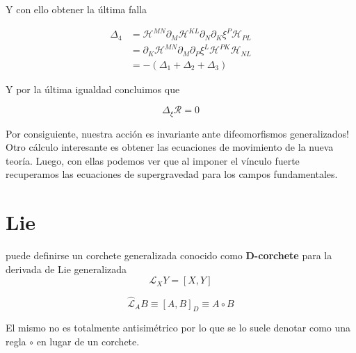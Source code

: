 \documentclass{article}
\numberwithin{equation}{section}
\begin{document}
Y con ello obtener la última falla

\begin{equation}\label{key}
\begin{aligned}
\Delta_4 &= \mathcal{H}^{MN}\partial_M \mathcal{H}^{KL}\partial_N\partial_K \xi^P\mathcal{H}_{PL}\\
&= \partial_K \mathcal{H}^{MN}\partial_M\partial_P \xi^L \mathcal{H}^{PK}\mathcal{H}_{NL}\\
&= - \left( \Delta_1 + \Delta_2 + \Delta_3\right)
\end{aligned}
\end{equation}

Y por la última igualdad concluimos que 

\begin{boxquation}
\begin{equation}\label{key}
\Delta_{\xi} \mathcal{R} = 0
\end{equation}
\end{boxquation}

Por consiguiente, nuestra acción es invariante ante difeomorfismos generalizados!\\

Otro cálculo interesante es obtener las ecuaciones de movimiento de la nueva teoría. Luego, con ellas podemos ver que al imponer el vínculo fuerte recuperamos las ecuaciones de supergravedad para los campos fundamentales.












\section{Lie}

puede definirse un corchete generalizada conocido como \textbf{D-corchete} para la derivada de Lie generalizada
\begin{equation}\label{key}
\mathcal{L}_X Y = \left[X,Y\right]
\end{equation}

\begin{equation}\label{key}
\hat{\mathcal{L}}_A B \equiv \left[A,B\right]_D \equiv A \circ B
\end{equation}  

El mismo no es totalmente antisimétrico por lo que se lo suele denotar como una regla $ \circ $ en lugar de un corchete.
\end{document}
